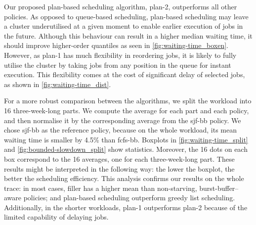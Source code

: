 \documentclass[runningheads]{llncs}
\newcommand\fixme[1]{
	\textcolor{blue}{{{\em\bf{[{\sc{{Fixme:}}} #1]}}}}
	}
\begin{document}
Our proposed plan-based scheduling algorithm, plan-2, outperforms all other policies. As opposed to queue-based scheduling, plan-based scheduling may leave a cluster underutilised at a given moment to enable earlier execution of jobs in the future. Although this behaviour can result in a higher median waiting time, it should improve higher-order quantiles as seen in \cref{fig:waiting-time_boxen}. However, as plan-1 has much flexibility in reordering jobs, it is likely to fully utilise the cluster by taking jobs from any position in the queue for instant execution. This flexibility comes at the cost of significant delay of selected jobs, as shown in \cref{fig:waiting-time_dist}.

For a more robust comparison between the algorithms, we split the workload into 16 three-week-long parts. We compute the average for each part and each policy, and then normalise it by the corresponding average from the sjf-bb policy. We chose sjf-bb as the reference policy, because on the whole workload, its mean waiting time is smaller by 4.5\% than fcfs-bb. Boxplots in \cref{fig:waiting-time_split} and \cref{fig:bounded-slowdown_split} show statistics. Moreover, the 16 dots on each box correspond to the 16 averages, one for each three-week-long part. These results might be interpreted in the following way: the lower the boxplot, the better the scheduling efficiency. This analysis confirms our results on the whole trace: in most cases, filler has a higher mean than non-starving, burst-buffer--aware policies; and plan-based scheduling outperform greedy list scheduling. Additionally, in the shorter workloads, plan-1 outperforms plan-2 because of the limited capability of delaying jobs.
\end{document}
